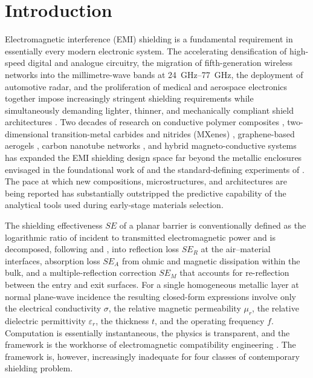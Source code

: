 \documentclass[review,3p,authoryear]{elsarticle}
\begin{document}
\section{Introduction}
\label{sec:intro}

Electromagnetic interference (EMI) shielding is a fundamental requirement in essentially every modern electronic system. The accelerating densification of high-speed digital and analogue circuitry, the migration of fifth-generation wireless networks into the millimetre-wave bands at \SIrange{24}{77}{GHz}, the deployment of automotive radar, and the proliferation of medical and aerospace electronics together impose increasingly stringent shielding requirements while simultaneously demanding lighter, thinner, and mechanically compliant shield architectures \citep{Wanasinghe2020, Hong2017, Liu2025AdvFunctMater, Wang2025NanoscaleAdv}. Two decades of research on conductive polymer composites \citep{AlSaleh2009, Bauhofer2009, Arjmand2011, Thomassin2013}, two-dimensional transition-metal carbides and nitrides (MXenes) \citep{Shahzad2016, Iqbal2020, Han2020, Hu2026Small, Liu2024Carbon}, graphene-based aerogels \citep{Shen2014, Yan2015, Zhang2016, He2024CEJ}, carbon nanotube networks \citep{Li2015, AlSaleh2009}, and hybrid magneto-conductive systems \citep{Song2014} has expanded the EMI shielding design space far beyond the metallic enclosures envisaged in the foundational work of \citet{Schelkunoff1934} and the standard-defining experiments of \citet{Schulz1988}. The pace at which new compositions, microstructures, and architectures are being reported has substantially outstripped the predictive capability of the analytical tools used during early-stage materials selection.

The shielding effectiveness $SE$ of a planar barrier is conventionally defined as the logarithmic ratio of incident to transmitted electromagnetic power and is decomposed, following \citet{Schelkunoff1934} and \citet{Schulz1988}, into reflection loss $SE_R$ at the air--material interfaces, absorption loss $SE_A$ from ohmic and magnetic dissipation within the bulk, and a multiple-reflection correction $SE_M$ that accounts for re-reflection between the entry and exit surfaces. For a single homogeneous metallic layer at normal plane-wave incidence the resulting closed-form expressions involve only the electrical conductivity $\sigma$, the relative magnetic permeability $\mu_r$, the relative dielectric permittivity $\varepsilon_r$, the thickness $t$, and the operating frequency $f$. Computation is essentially instantaneous, the physics is transparent, and the framework is the workhorse of electromagnetic compatibility engineering \citep{Ott2009, Paul2006, Pozar2011, Celozzi2008}. The framework is, however, increasingly inadequate for four classes of contemporary shielding problem.
\end{document}

